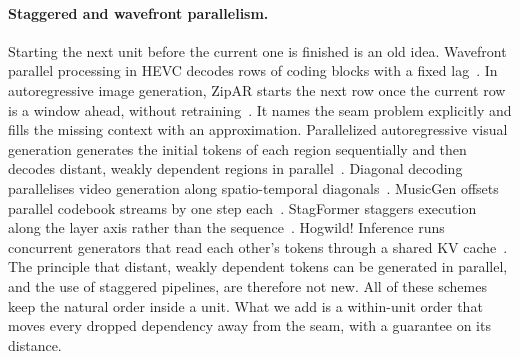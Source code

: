 \documentclass[11pt]{article}
\theoremstyle{definition}
\theoremstyle{remark}
\begin{document}
\paragraph{Staggered and wavefront parallelism.}
Starting the next unit before the current one is finished is an old idea.
Wavefront parallel processing in HEVC decodes rows of coding blocks with a fixed lag~\citep{sullivan2012hevc}.
In autoregressive image generation, ZipAR starts the next row once the current row is a window ahead, without retraining~\citep{he2025zipar}.
It names the seam problem explicitly and fills the missing context with an approximation.
Parallelized autoregressive visual generation generates the initial tokens of each region sequentially and then decodes distant, weakly dependent regions in parallel~\citep{wang2025par}.
Diagonal decoding parallelises video generation along spatio-temporal diagonals~\citep{ye2025diagonal}.
MusicGen offsets parallel codebook streams by one step each~\citep{copet2023musicgen}.
StagFormer staggers execution along the layer axis rather than the sequence~\citep{cutler2025stagformer}.
Hogwild! Inference runs concurrent generators that read each other's tokens through a shared KV cache~\citep{rodionov2025hogwild}.
The principle that distant, weakly dependent tokens can be generated in parallel, and the use of staggered pipelines, are therefore not new.
All of these schemes keep the natural order inside a unit.
What we add is a within-unit order that moves every dropped dependency away from the seam, with a guarantee on its distance.
\end{document}
